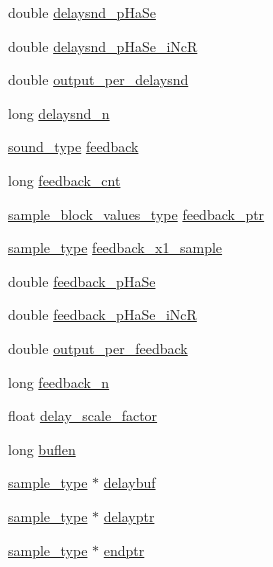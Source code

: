 \begin{DoxyCompactItemize}
double \hyperlink{structalpassvv__susp__struct_aba846cd11718a6f0efe094a17787e455}{delaysnd\+\_\+p\+Ha\+Se}
\item 
double \hyperlink{structalpassvv__susp__struct_a24931e700292536851e3aa2b1e19f267}{delaysnd\+\_\+p\+Ha\+Se\+\_\+i\+NcR}
\item 
double \hyperlink{structalpassvv__susp__struct_a6cb377d1ee59fbab7d58142db035b13d}{output\+\_\+per\+\_\+delaysnd}
\item 
long \hyperlink{structalpassvv__susp__struct_aaa748ad75450969eaf599b58020545cb}{delaysnd\+\_\+n}
\item 
\hyperlink{sound_8h_a792cec4ed9d6d636d342d9365ba265ea}{sound\+\_\+type} \hyperlink{structalpassvv__susp__struct_a5e035cd86b0c9f824a443c855b31b5fc}{feedback}
\item 
long \hyperlink{structalpassvv__susp__struct_aaee2cbe000eba08e5ed73789c47cec7b}{feedback\+\_\+cnt}
\item 
\hyperlink{sound_8h_a83d17f7b465d1591f27cd28fc5eb8a03}{sample\+\_\+block\+\_\+values\+\_\+type} \hyperlink{structalpassvv__susp__struct_a08c63d19964ffc464a85ebe55c01a2eb}{feedback\+\_\+ptr}
\item 
\hyperlink{sound_8h_a3a9d1d4a1c153390d2401a6e9f71b32c}{sample\+\_\+type} \hyperlink{structalpassvv__susp__struct_a036d13841499140d5dbd953660ba5aac}{feedback\+\_\+x1\+\_\+sample}
\item 
double \hyperlink{structalpassvv__susp__struct_a58336182ef009478c15c413ba46d8594}{feedback\+\_\+p\+Ha\+Se}
\item 
double \hyperlink{structalpassvv__susp__struct_a29371b68e8634d9de7c3d5313edbbcda}{feedback\+\_\+p\+Ha\+Se\+\_\+i\+NcR}
\item 
double \hyperlink{structalpassvv__susp__struct_a5135dfdc6032b5a83537ede31a0ed58f}{output\+\_\+per\+\_\+feedback}
\item 
long \hyperlink{structalpassvv__susp__struct_a2c0ac71bb0240adcf8c67793a8cd444c}{feedback\+\_\+n}
\item 
float \hyperlink{structalpassvv__susp__struct_a9339e326516a6dfc33b9433607c707e2}{delay\+\_\+scale\+\_\+factor}
\item 
long \hyperlink{structalpassvv__susp__struct_a8accb8e7e5e8355ec1dff41ecd229cc0}{buflen}
\item 
\hyperlink{sound_8h_a3a9d1d4a1c153390d2401a6e9f71b32c}{sample\+\_\+type} $\ast$ \hyperlink{structalpassvv__susp__struct_a52f7c533a1d2c6b2504ae93882a18d5d}{delaybuf}
\item 
\hyperlink{sound_8h_a3a9d1d4a1c153390d2401a6e9f71b32c}{sample\+\_\+type} $\ast$ \hyperlink{structalpassvv__susp__struct_a333b3171a22c3896dcf39c990c9b8f33}{delayptr}
\item 
\hyperlink{sound_8h_a3a9d1d4a1c153390d2401a6e9f71b32c}{sample\+\_\+type} $\ast$ \hyperlink{structalpassvv__susp__struct_a742e4b79a74150b4b998e09c8785cc97}{endptr}
\end{DoxyCompactItemize}


